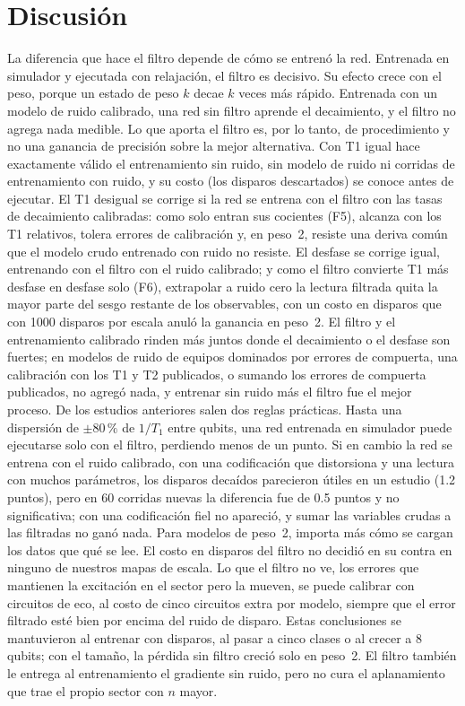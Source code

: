 \documentclass[11pt]{article}
\begin{document}
\section{Discusión}

La diferencia que hace el filtro depende de cómo se entrenó la red. Entrenada en simulador y ejecutada con
relajación, el filtro es decisivo. Su efecto crece con el peso, porque un estado de peso $k$ decae $k$ veces más
rápido. Entrenada con un modelo de ruido calibrado, una red sin filtro aprende el decaimiento, y el filtro no
agrega nada medible. Lo que aporta el filtro es, por lo tanto, de procedimiento y no una ganancia de precisión
sobre la mejor alternativa. Con T1 igual hace exactamente válido el entrenamiento sin ruido, sin modelo de ruido
ni corridas de entrenamiento con ruido, y su costo (los disparos descartados) se conoce antes de ejecutar. El T1
desigual se corrige si la red se entrena con el filtro con las tasas de decaimiento calibradas: como solo
entran sus cocientes (F5), alcanza con los T1 relativos, tolera errores de calibración y, en peso~2, resiste una deriva
común que el modelo crudo entrenado con ruido no resiste. El desfase se corrige igual, entrenando con el filtro con el
ruido calibrado; y como el filtro convierte T1 más desfase en desfase solo (F6), extrapolar a ruido cero la lectura
filtrada quita la mayor parte del sesgo restante de los observables, con un costo en disparos que con 1000 disparos por
escala anuló la ganancia en peso~2. El filtro y el entrenamiento calibrado rinden más juntos donde el decaimiento o el desfase son fuertes; en modelos de
ruido de equipos dominados por errores de compuerta, una calibración con los T1 y T2 publicados, o sumando los errores de compuerta publicados, no agregó nada, y
entrenar sin ruido más el filtro fue el mejor proceso. De los estudios anteriores salen dos reglas prácticas.
Hasta una dispersión de $\pm80\,\%$ de $1/T_1$ entre qubits, una red entrenada en simulador puede ejecutarse
solo con el filtro, perdiendo menos de un punto. Si en cambio la red se entrena con el ruido calibrado, con una
codificación que distorsiona y una lectura con muchos parámetros, los disparos decaídos parecieron útiles en un
estudio (1.2 puntos), pero en 60 corridas nuevas la diferencia fue de 0.5 puntos y no significativa; con una
codificación fiel no apareció, y sumar las variables crudas a las filtradas no ganó nada. Para modelos de peso~2, importa más cómo se cargan los datos que qué se lee. El costo en disparos del filtro no decidió en su contra en ninguno de nuestros mapas de escala. Lo que el filtro
no ve, los errores que mantienen la excitación en el sector pero la mueven, se puede calibrar con circuitos de eco, al
costo de cinco circuitos extra por modelo, siempre que el error filtrado esté bien por encima del ruido de disparo.
Estas conclusiones se mantuvieron al entrenar con disparos, al pasar a cinco clases o al crecer a 8 qubits; con el
tamaño, la pérdida sin filtro creció solo en peso~2. El filtro también le entrega al entrenamiento el gradiente sin
ruido, pero no cura el aplanamiento que trae el propio sector con $n$ mayor.
\end{document}
